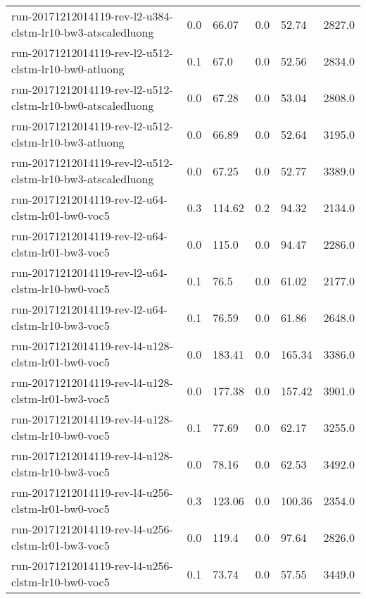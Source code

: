 \begin{landscape}
\begin{longtable}{p{.47\textheight} p{.08\textheight} p{.08\textheight} p{.08\textheight} p{.08\textheight} p{.08\textheight}}
    run-20171212014119-rev-l2-u384-clstm-lr10-bw3-atscaledluong & \num{0.0} & \num{66.07} & \num{0.0} & \num{52.74} & \num{2827.0}\\
    run-20171212014119-rev-l2-u512-clstm-lr10-bw0-atluong & \num{0.1} & \num{67.0} & \num{0.0} & \num{52.56} & \num{2834.0}\\
    run-20171212014119-rev-l2-u512-clstm-lr10-bw0-atscaledluong & \num{0.0} & \num{67.28} & \num{0.0} & \num{53.04} & \num{2808.0}\\
    run-20171212014119-rev-l2-u512-clstm-lr10-bw3-atluong & \num{0.0} & \num{66.89} & \num{0.0} & \num{52.64} & \num{3195.0}\\
    run-20171212014119-rev-l2-u512-clstm-lr10-bw3-atscaledluong & \num{0.0} & \num{67.25} & \num{0.0} & \num{52.77} & \num{3389.0}\\
    run-20171212014119-rev-l2-u64-clstm-lr01-bw0-voc5 & \num{0.3} & \num{114.62} & \num{0.2} & \num{94.32} & \num{2134.0}\\
    run-20171212014119-rev-l2-u64-clstm-lr01-bw3-voc5 & \num{0.0} & \num{115.0} & \num{0.0} & \num{94.47} & \num{2286.0}\\
    run-20171212014119-rev-l2-u64-clstm-lr10-bw0-voc5 & \num{0.1} & \num{76.5} & \num{0.0} & \num{61.02} & \num{2177.0}\\
    run-20171212014119-rev-l2-u64-clstm-lr10-bw3-voc5 & \num{0.1} & \num{76.59} & \num{0.0} & \num{61.86} & \num{2648.0}\\
    run-20171212014119-rev-l4-u128-clstm-lr01-bw0-voc5 & \num{0.0} & \num{183.41} & \num{0.0} & \num{165.34} & \num{3386.0}\\
    run-20171212014119-rev-l4-u128-clstm-lr01-bw3-voc5 & \num{0.0} & \num{177.38} & \num{0.0} & \num{157.42} & \num{3901.0}\\
    run-20171212014119-rev-l4-u128-clstm-lr10-bw0-voc5 & \num{0.1} & \num{77.69} & \num{0.0} & \num{62.17} & \num{3255.0}\\
    run-20171212014119-rev-l4-u128-clstm-lr10-bw3-voc5 & \num{0.0} & \num{78.16} & \num{0.0} & \num{62.53} & \num{3492.0}\\
    run-20171212014119-rev-l4-u256-clstm-lr01-bw0-voc5 & \num{0.3} & \num{123.06} & \num{0.0} & \num{100.36} & \num{2354.0}\\
    run-20171212014119-rev-l4-u256-clstm-lr01-bw3-voc5 & \num{0.0} & \num{119.4} & \num{0.0} & \num{97.64} & \num{2826.0}\\
    run-20171212014119-rev-l4-u256-clstm-lr10-bw0-voc5 & \num{0.1} & \num{73.74} & \num{0.0} & \num{57.55} & \num{3449.0}\\

\end{longtable}
\end{landscape}
